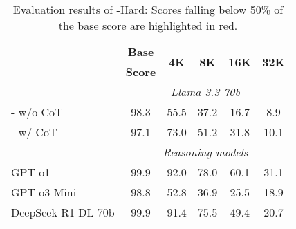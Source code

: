 \begin{table}[t!]
        \small
	\setlength\tabcolsep{4pt}
	\centering
	\begin{tabular}{lccccc}
		\toprule
         & \textbf{Base} & \multirow{2}{*}{\textbf{4K}} & \multirow{2}{*}{\textbf{8K}} & \multirow{2}{*}{\textbf{16K}} & \multirow{2}{*}{\textbf{32K}} \\
         & \textbf{Score} &&&& \\
        \midrule
        &\multicolumn{5}{c}{\emph{Llama 3.3 70b}} \\
        - w/o CoT     & 98.3 & 55.5 & \cellcolor[HTML]{faa7a7}37.2 & \cellcolor[HTML]{faa7a7}16.7 & \cellcolor[HTML]{faa7a7}8.9 \\
        - w/ CoT    & 97.1 & 73.0 & 51.2 & \cellcolor[HTML]{faa7a7}31.8 & \cellcolor[HTML]{faa7a7}10.1 \\
        \midrule
        &\multicolumn{5}{c}{\emph{Reasoning models}} \\
        GPT-o1    & 99.9 & 92.0 & 78.0 & 60.1 & \cellcolor[HTML]{faa7a7}31.1 \\
        GPT-o3 Mini   &      98.8 & 52.8 & \cellcolor[HTML]{faa7a7}36.9 & \cellcolor[HTML]{faa7a7}25.5 & \cellcolor[HTML]{faa7a7}18.9 \\
        DeepSeek R1-DL-70b & 99.9 & 91.4 & 75.5 & \cellcolor[HTML]{faa7a7}49.4 & \cellcolor[HTML]{faa7a7}20.7 \\
	\bottomrule
	\end{tabular}
	\caption{Evaluation results of \framework-Hard: Scores falling below 50\% of the base score are highlighted in \colorbox{shadedRed}{red}.}
	\label{tab:results_w_reasoningmodels}
\end{table}